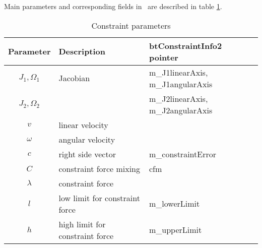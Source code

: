 Main parameters  and corresponding fields in \bullet\  
 are described in table \ref{tab:constraintParameters}.

\begin {table}[htb!]
\begin{center}
\begin{tabular}{|c| l| l|}
\hline
{\bf Parameter} & {\bf Description} & {\bf btConstraintInfo2 pointer}\\  \hline
$J_1, \Omega_1$ & Jacobian & m\_J1linearAxis, m\_J1angularAxis \\ 
$J_2, \Omega_2$ & & m\_J2linearAxis, m\_J2angularAxis \\ \hline
$v$ & linear velocity & \\ \hline
$\omega$ & angular velocity & \\ \hline
$c$        &  right side vector   & m\_constraintError \\ \hline
$C$  & constraint force mixing & cfm \\  \hline
$\lambda$ & constraint force &  \\ \hline
$l$ & low limit for constraint force & m\_lowerLimit \\ \hline
$h$ & high limit for constraint force & m\_upperLimit \\ \hline
\end {tabular}
\end{center}
\caption {Constraint parameters} \label{tab:constraintParameters} 
\end {table}
